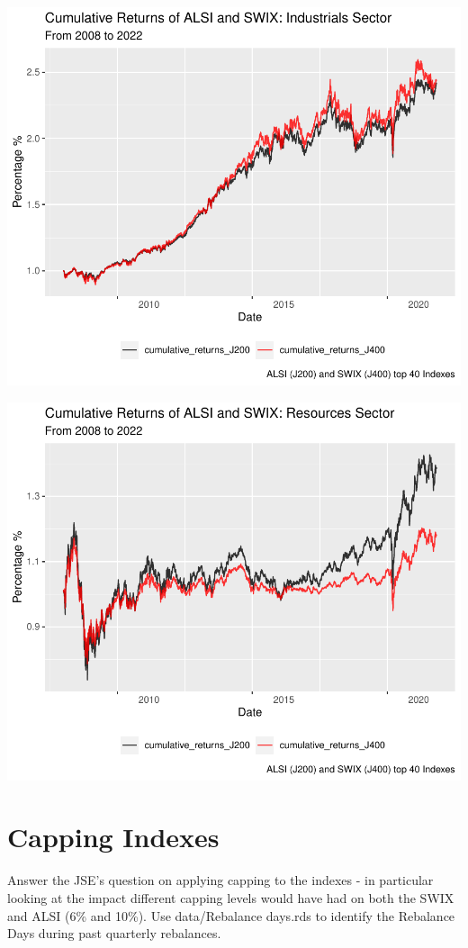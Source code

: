 \documentclass[11pt,preprint, authoryear]{elsarticle}
\numberwithin{equation}{section}
\numberwithin{figure}{section}
\numberwithin{table}{section}
\begin{document}
\includegraphics{Question3_files/figure-latex/unnamed-chunk-4-1.pdf}

\includegraphics{Question3_files/figure-latex/unnamed-chunk-5-1.pdf}

\hypertarget{capping-indexes}{%
\section{Capping Indexes}\label{capping-indexes}}

Answer the JSE's question on applying capping to the indexes - in
particular looking at the impact different capping levels would have had
on both the SWIX and ALSI (6\% and 10\%). Use data/Rebalance days.rds to
identify the Rebalance Days during past quarterly rebalances.
\end{document}
